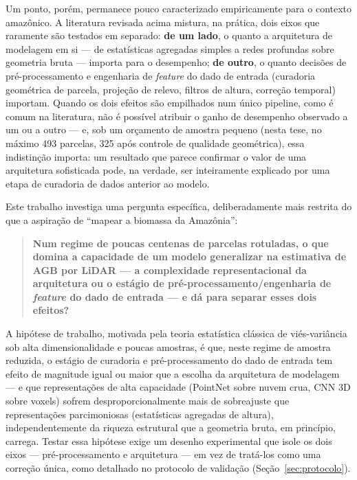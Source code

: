 Um ponto, porém, permanece pouco caracterizado empiricamente para o contexto
amazônico. A literatura revisada acima mistura, na prática, dois eixos que
raramente são testados em separado: \textbf{de um lado}, o quanto a arquitetura
de modelagem em si --- de estatísticas agregadas simples a redes profundas
sobre geometria bruta --- importa para o desempenho; \textbf{de outro}, o
quanto decisões de pré-processamento e engenharia de \textit{feature} do dado
de entrada (curadoria geométrica de parcela, projeção de relevo, filtros de
altura, correção temporal) importam. Quando os dois efeitos são empilhados num
único pipeline, como é comum na literatura, não é possível atribuir o ganho de
desempenho observado a um ou a outro --- e, sob um orçamento de amostra
pequeno (nesta tese, no máximo 493 parcelas, 325 após controle de qualidade
geométrica), essa indistinção importa: um resultado que parece confirmar o
valor de uma arquitetura sofisticada pode, na verdade, ser inteiramente
explicado por uma etapa de curadoria de dados anterior ao modelo.

\label{sec:rq}
Este trabalho investiga uma pergunta específica, deliberadamente mais restrita do
que a aspiração de ``mapear a biomassa da Amazônia'':

\begin{quote}
\textbf{Num regime de poucas centenas de parcelas rotuladas, o que domina a
capacidade de um modelo generalizar na estimativa de AGB por LiDAR --- a
complexidade representacional da arquitetura ou o estágio de
pré-processamento/engenharia de \textit{feature} do dado de entrada --- e dá
para separar esses dois efeitos?}
\end{quote}

A hipótese de trabalho, motivada pela teoria estatística clássica de
viés-variância sob alta dimensionalidade e poucas amostras, é que, neste
regime de amostra reduzida, o estágio de curadoria e pré-processamento do dado
de entrada tem efeito de magnitude igual ou maior que a escolha da
arquitetura de modelagem --- e que representações de alta capacidade (PointNet
sobre nuvem crua, CNN 3D sobre voxels) sofrem desproporcionalmente mais de
sobreajuste que representações parcimoniosas (estatísticas agregadas de
altura), independentemente da riqueza estrutural que a geometria bruta, em
princípio, carrega. Testar essa hipótese exige um desenho experimental que
isole os dois eixos --- pré-processamento e arquitetura --- em vez de tratá-los
como uma correção única, como detalhado no protocolo de validação
(Seção~\ref{sec:protocolo}).

